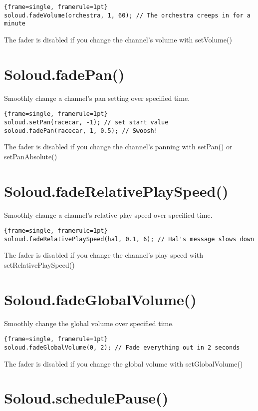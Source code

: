 \begin{lstlisting}{frame=single, framerule=1pt}
soloud.fadeVolume(orchestra, 1, 60); // The orchestra creeps in for a minute
\end{lstlisting}

The fader is disabled if you change the channel's volume with setVolume()

\section{Soloud.fadePan()}

Smoothly change a channel's pan setting over specified time.

\begin{lstlisting}{frame=single, framerule=1pt}
soloud.setPan(racecar, -1); // set start value
soloud.fadePan(racecar, 1, 0.5); // Swoosh!
\end{lstlisting}

The fader is disabled if you change the channel's panning with setPan() or setPanAbsolute()

\section{Soloud.fadeRelativePlaySpeed()}

Smoothly change a channel's relative play speed over specified time.

\begin{lstlisting}{frame=single, framerule=1pt}
soloud.fadeRelativePlaySpeed(hal, 0.1, 6); // Hal's message slows down
\end{lstlisting}

The fader is disabled if you change the channel's play speed with setRelativePlaySpeed()

\section{Soloud.fadeGlobalVolume()}

Smoothly change the global volume over specified time.

\begin{lstlisting}{frame=single, framerule=1pt}
soloud.fadeGlobalVolume(0, 2); // Fade everything out in 2 seconds
\end{lstlisting}

The fader is disabled if you change the global volume with setGlobalVolume()

\section{Soloud.schedulePause()}

